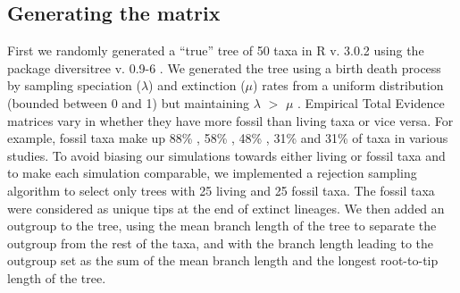 \documentclass[12pt,letterpaper]{article}
\begin{document}

\subsection{Generating the matrix}
\label{Generating_the_matrix}
First we randomly generated a ``true'' tree of 50 taxa in R v. 3.0.2 \citep{R302} using the package diversitree v. 0.9-6 \citep{fitzjohndiversitree2012}.
We generated the tree using a birth death process by sampling speciation ($\lambda$) and extinction ($\mu$) rates from a uniform distribution (bounded between 0 and 1) but maintaining $\lambda$ $>$ $\mu$ \citep{paradistime-dependent2011}.
Empirical Total Evidence matrices vary in whether they have more fossil than living taxa or vice versa.
For example, fossil taxa make up 88\% \citep{beckancient2014}, 58\% \citep{schragocombining2013}, 48\% \citep{pyrondivergence2011}, 31\% \citep{ronquista2012} and 31\% \citep{slaterphylogenetic2013} of taxa in various studies.
To avoid biasing our simulations towards either living or fossil taxa and to make each simulation comparable, we implemented a rejection sampling algorithm to select only trees with 25 living and 25 fossil taxa.
The fossil taxa were considered as unique tips at the end of extinct lineages.
We then added an outgroup to the tree, using the mean branch length of the tree to separate the outgroup from the rest of the taxa, and with the branch length leading to the outgroup set as the sum of the mean branch length and the longest root-to-tip length of the tree.
\end{document}
